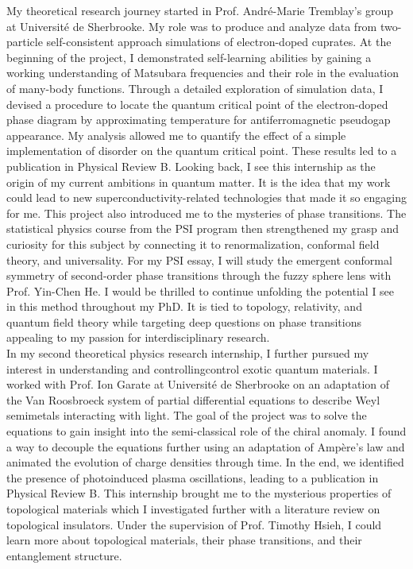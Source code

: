 \documentclass[12pt]{article}
\begin{document}
My theoretical research journey started in Prof. André-Marie Tremblay's group at Université de Sherbrooke. My role was to produce and analyze data from two-particle self-consistent approach simulations of electron-doped cuprates. At the beginning of the project, I demonstrated self-learning abilities by gaining a working understanding of Matsubara frequencies and their role in the evaluation of many-body functions. Through a detailed exploration of simulation data, I devised a procedure to locate the quantum critical point of the electron-doped phase diagram by approximating temperature for antiferromagnetic pseudogap appearance. My analysis allowed me to quantify the effect of a simple implementation of disorder on the quantum critical point. These results led to a publication in Physical Review B. Looking back, I see this internship as the origin of my current ambitions in quantum matter. It is the idea that my work could lead to new superconductivity-related technologies that made it so engaging for me. This project also introduced me to the mysteries of phase transitions. The statistical physics course from the PSI program then strengthened my grasp and curiosity for this subject by connecting it to renormalization, conformal field theory, and universality. For my PSI essay, I will study the emergent conformal symmetry of second-order phase transitions through the fuzzy sphere lens with Prof. Yin-Chen He. I would be thrilled to continue unfolding the potential I see in this method throughout my PhD. It is tied to topology, relativity, and quantum field theory while targeting deep questions on phase transitions appealing to my passion for interdisciplinary research.\\

In my second theoretical physics research internship, I further pursued my interest in understanding and controllingcontrol exotic quantum materials. I worked with Prof. Ion Garate at Université de Sherbrooke on an adaptation of the Van Roosbroeck system of partial differential equations to describe Weyl semimetals interacting with light. The goal of the project was to solve the equations to gain insight into the semi-classical role of the chiral anomaly. I found a way to decouple the equations further using an adaptation of Ampère's law and animated the evolution of charge densities through time. In the end, we identified the presence of photoinduced plasma oscillations, leading to a publication in Physical Review B. This internship brought me to the mysterious properties of topological materials which I investigated further with a  literature review on topological insulators. Under the supervision of Prof. Timothy Hsieh, I could learn more about topological materials, their phase transitions, and their entanglement structure.\\
\end{document}
